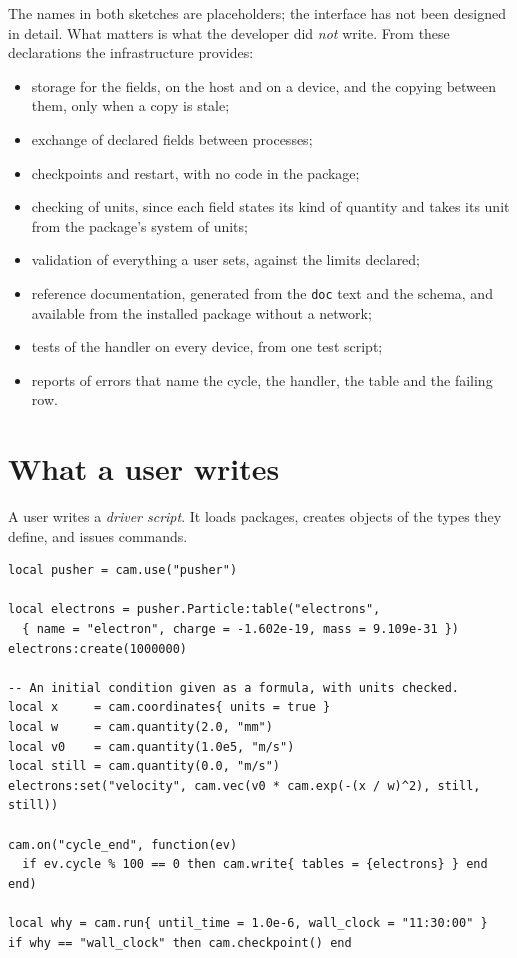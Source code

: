 \documentclass[11pt,a4paper]{article}
\newcommand{\code}[1]{\texttt{#1}}
\begin{document}
The names in both sketches are placeholders; the interface has not been
designed in detail.  What matters is what the developer did \emph{not}
write.  From these declarations the infrastructure provides:

\begin{itemize}[itemsep=1pt]
  \item storage for the fields, on the host and on a device, and the copying
        between them, only when a copy is stale;
  \item exchange of declared fields between processes;
  \item checkpoints and restart, with no code in the package;
  \item checking of units, since each field states its kind of quantity and
        takes its unit from the package's system of units;
  \item validation of everything a user sets, against the limits declared;
  \item reference documentation, generated from the \code{doc} text and the
        schema, and available from the installed package without a network;
  \item tests of the handler on every device, from one test script;
  \item reports of errors that name the cycle, the handler, the table and
        the failing row.
\end{itemize}

\section{What a user writes}

A user writes a \emph{driver script}.  It loads packages, creates objects of
the types they define, and issues commands.

\begin{lstlisting}[language={[5.3]Lua}]
local pusher = cam.use("pusher")

local electrons = pusher.Particle:table("electrons",
  { name = "electron", charge = -1.602e-19, mass = 9.109e-31 })
electrons:create(1000000)

-- An initial condition given as a formula, with units checked.
local x     = cam.coordinates{ units = true }
local w     = cam.quantity(2.0, "mm")
local v0    = cam.quantity(1.0e5, "m/s")
local still = cam.quantity(0.0, "m/s")
electrons:set("velocity", cam.vec(v0 * cam.exp(-(x / w)^2), still, still))

cam.on("cycle_end", function(ev)
  if ev.cycle % 100 == 0 then cam.write{ tables = {electrons} } end
end)

local why = cam.run{ until_time = 1.0e-6, wall_clock = "11:30:00" }
if why == "wall_clock" then cam.checkpoint() end
\end{lstlisting}
\end{document}
